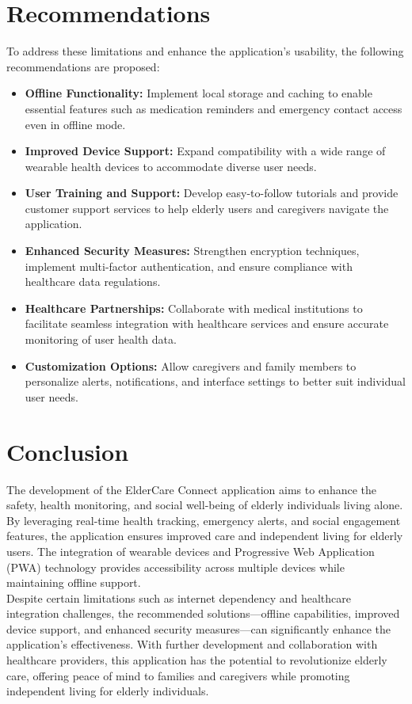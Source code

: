 \section{Recommendations}
To address these limitations and enhance the application's usability, the following recommendations are proposed:
\begin{itemize}
    \item \textbf{Offline Functionality:} Implement local storage and caching to enable essential features such as medication reminders and emergency contact access even in offline mode.
    \item \textbf{Improved Device Support:} Expand compatibility with a wide range of wearable health devices to accommodate diverse user needs.
    \item \textbf{User Training and Support:} Develop easy-to-follow tutorials and provide customer support services to help elderly users and caregivers navigate the application.
    \item \textbf{Enhanced Security Measures:} Strengthen encryption techniques, implement multi-factor authentication, and ensure compliance with healthcare data regulations.
    \item \textbf{Healthcare Partnerships:} Collaborate with medical institutions to facilitate seamless integration with healthcare services and ensure accurate monitoring of user health data.
    \item \textbf{Customization Options:} Allow caregivers and family members to personalize alerts, notifications, and interface settings to better suit individual user needs.
\end{itemize}
\section{Conclusion}
The development of the ElderCare Connect application aims to enhance the safety, health monitoring, and social well-being of elderly individuals living alone. By leveraging real-time health tracking, emergency alerts, and social engagement features, the application ensures improved care and independent living for elderly users. The integration of wearable devices and Progressive Web Application (PWA) technology provides accessibility across multiple devices while maintaining offline support.\\
Despite certain limitations such as internet dependency and healthcare integration challenges, the recommended solutions—offline capabilities, improved device support, and enhanced security measures—can significantly enhance the application's effectiveness. With further development and collaboration with healthcare providers, this application has the potential to revolutionize elderly care, offering peace of mind to families and caregivers while promoting independent living for elderly individuals.



